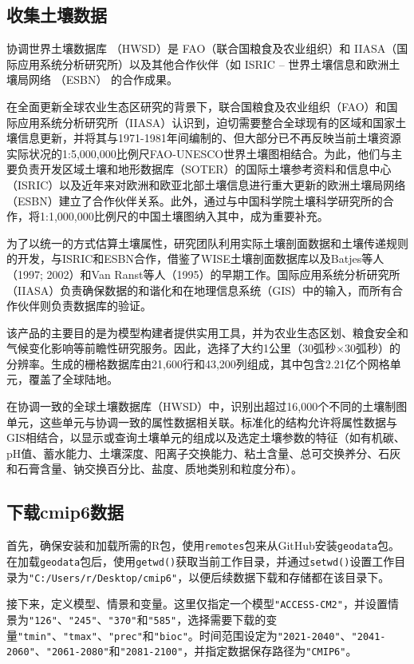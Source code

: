 \documentclass[AutoFakeBold]{LZUThesis-PgD&PhD}
\begin{document}
\subsection{收集土壤数据}


协调世界土壤数据库 （HWSD）是 FAO（联合国粮食及农业组织）和 IIASA（国际应用系统分析研究所）以及其他合作伙伴（如 ISRIC – 世界土壤信息和欧洲土壤局网络 （ESBN） 的合作成果。

在全面更新全球农业生态区研究的背景下，联合国粮食及农业组织（FAO）和国际应用系统分析研究所（IIASA）认识到，迫切需要整合全球现有的区域和国家土壤信息更新，并将其与1971-1981年间编制的、但大部分已不再反映当前土壤资源实际状况的1:5,000,000比例尺FAO-UNESCO世界土壤图相结合。为此，他们与主要负责开发区域土壤和地形数据库（SOTER）的国际土壤参考资料和信息中心（ISRIC）以及近年来对欧洲和欧亚北部土壤信息进行重大更新的欧洲土壤局网络（ESBN）建立了合作伙伴关系。此外，通过与中国科学院土壤科学研究所的合作，将1:1,000,000比例尺的中国土壤图纳入其中，成为重要补充。

为了以统一的方式估算土壤属性，研究团队利用实际土壤剖面数据和土壤传递规则的开发，与ISRIC和ESBN合作，借鉴了WISE土壤剖面数据库以及Batjes等人（1997; 2002）和Van Ranst等人（1995）的早期工作。国际应用系统分析研究所（IIASA）负责确保数据的和谐化和在地理信息系统（GIS）中的输入，而所有合作伙伴则负责数据库的验证。

该产品的主要目的是为模型构建者提供实用工具，并为农业生态区划、粮食安全和气候变化影响等前瞻性研究服务。因此，选择了大约1公里（30弧秒×30弧秒）的分辨率。生成的栅格数据库由21,600行和43,200列组成，其中包含2.21亿个网格单元，覆盖了全球陆地。

在协调一致的全球土壤数据库（HWSD）中，识别出超过16,000个不同的土壤制图单元，这些单元与协调一致的属性数据相关联。标准化的结构允许将属性数据与GIS相结合，以显示或查询土壤单元的组成以及选定土壤参数的特征（如有机碳、pH值、蓄水能力、土壤深度、阳离子交换能力、粘土含量、总可交换养分、石灰和石膏含量、钠交换百分比、盐度、质地类别和粒度分布）。
    
\subsection{下载cmip6数据}
首先，确保安装和加载所需的R包，使用\texttt{remotes}包来从GitHub安装\texttt{geodata}包。在加载\texttt{geodata}包后，使用\texttt{getwd()}获取当前工作目录，并通过\texttt{setwd()}设置工作目录为\texttt{"C:/Users/r/Desktop/cmip6"}，以便后续数据下载和存储都在该目录下。

接下来，定义模型、情景和变量。这里仅指定一个模型\texttt{"ACCESS-CM2"}，并设置情景为\texttt{"126"}、\texttt{"245"}、\texttt{"370"}和\texttt{"585"}，选择需要下载的变量\texttt{"tmin"}、\texttt{"tmax"}、\texttt{"prec"}和\texttt{"bioc"}。时间范围设定为\texttt{"2021-2040"}、\texttt{"2041-2060"}、\texttt{"2061-2080"}和\texttt{"2081-2100"}，并指定数据保存路径为\texttt{"CMIP6"}。
\end{document}
